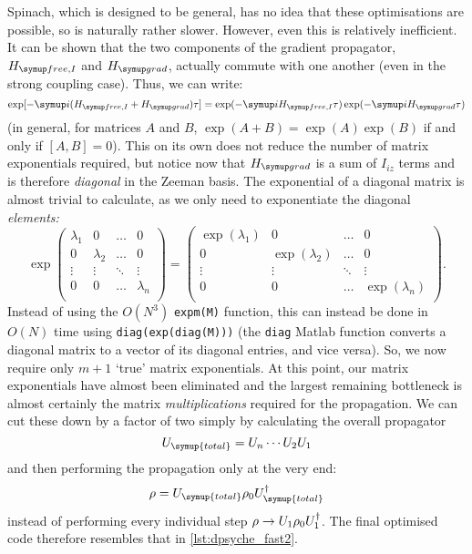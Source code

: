 Spinach, which is designed to be general, has no idea that these optimisations are possible, so is naturally rather slower.
However, even this is relatively inefficient.
It can be shown that the two components of the gradient propagator, $\HfreeI$ and $\Hgrad$, actually commute with one another (even in the strong coupling case).
Thus, we can write:
\begin{equation}
    \label{eq:split_propagator}
    \exp[-\mi(\HfreeI + \Hgrad)\tau] = \exp(-\mi\HfreeI\tau) \exp(-\mi\Hgrad\tau)
\end{equation}
(in general, for matrices $A$ and $B$, $\exp(A + B) = \exp(A)\exp(B)$ if and only if $[A, B] = 0$).
This on its own does not reduce the number of matrix exponentials required, but notice now that $\Hgrad$ is a sum of $I_{iz}$ terms and is therefore \textit{diagonal} in the Zeeman basis.
The exponential of a diagonal matrix is almost trivial to calculate, as we only need to exponentiate the diagonal \textit{elements:}
\begin{equation}
    \label{eq:expm_diagonal}
    \exp
    \begin{pmatrix}
        \lambda_1 & 0 & \ldots & 0 \\
        0 & \lambda_2 & \ldots & 0 \\
        \vdots & \vdots & \ddots & \vdots \\
        0 & 0 & \ldots & \lambda_n \\
    \end{pmatrix}
    = 
    \begin{pmatrix}
        \exp(\lambda_1) & 0 & \ldots & 0 \\
        0 & \exp(\lambda_2) & \ldots & 0 \\
        \vdots & \vdots & \ddots & \vdots \\
        0 & 0 & \ldots & \exp(\lambda_n) \\
    \end{pmatrix}.
\end{equation}
Instead of using the $O(N^3)$ \texttt{expm(M)} function, this can instead be done in $O(N)$ time using \texttt{diag(exp(diag(M)))} (the \texttt{diag} Matlab function converts a diagonal matrix to a vector of its diagonal entries, and vice versa).
So, we now require only $m + 1$ `true' matrix exponentials.
At this point, our matrix exponentials have almost been eliminated and the largest remaining bottleneck is almost certainly the matrix \textit{multiplications} required for the propagation.
We can cut these down by a factor of two simply by calculating the overall propagator
\begin{equation}
    \label{eq:overall_propagator}
    U_{\symup{total}} = U_n\cdots U_2U_1
\end{equation}
and then performing the propagation only at the very end:
\begin{equation}
    \label{eq:overall_propagation}
    \rho = U_{\symup{total}} \rho_0 \adj{U_{\symup{total}}}
\end{equation}
instead of performing every individual step $\rho \to U_1\rho_0U_1^\dagger$.
The final optimised code therefore resembles that in \cref{lst:dpsyche_fast2}.


